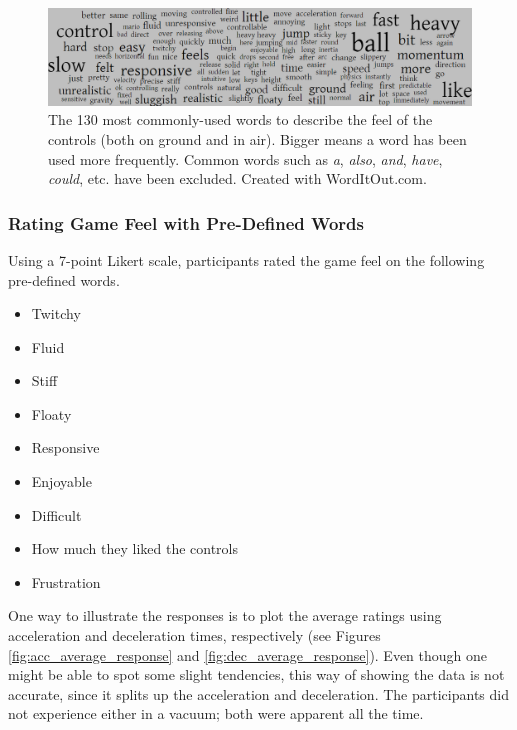 \begin{figure}[htbp]
\centering
\includegraphics[width=1\textwidth]{Pics/wordcloud}
\caption{The 130 most commonly-used words to describe the feel of the controls (both on ground and in air). Bigger means a word has been used more frequently. Common words such as \textit{a}, \textit{also}, \textit{and}, \textit{have}, \textit{could}, etc. have been excluded. Created with WordItOut.com.}
\label{fig:wordcloud}
\end{figure}

\subsubsection{Rating Game Feel with Pre-Defined Words}
Using a 7-point Likert scale, participants rated the game feel on the following pre-defined words.
\begin{itemize}[noitemsep,nolistsep]
\item Twitchy
\item Fluid
\item Stiff
\item Floaty
\item Responsive
\item Enjoyable
\item Difficult
\item How much they liked the controls
\item Frustration
\end{itemize}


One way to illustrate the responses is to plot the average ratings using acceleration and deceleration times, respectively (see Figures \ref{fig:acc_average_response} and \ref{fig:dec_average_response}). Even though one might be able to spot some slight tendencies, this way of showing the data is not accurate, since it splits up the acceleration and deceleration. The participants did not experience either in a vacuum; both were apparent all the time.

